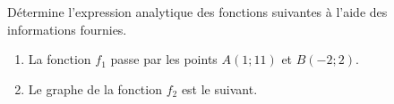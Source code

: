 %
%
    Détermine l'expression analytique des fonctions suivantes à l'aide des informations fournies.
    \begin{enumerate}
        \item La fonction $f_1$ passe par les points $A(1;11)$ et $B(-2;2)$.
        \item Le graphe de la fonction $f_2$ est le suivant. 
    \end{enumerate}
